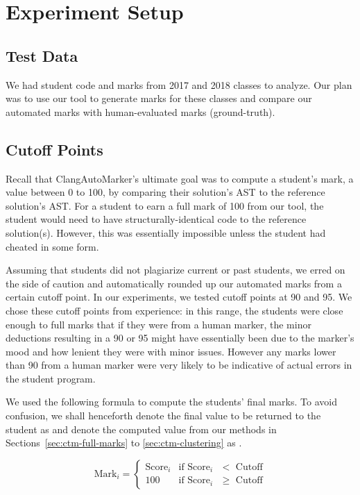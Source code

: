 \section{Experiment Setup}

\subsection{Test Data}

We had student code and marks from 2017 and 2018 classes to analyze. Our plan was to use our tool to generate marks for these classes and compare our automated marks with human-evaluated marks (ground-truth).

\subsection{Cutoff Points}
\label{sec:ctm-cutoffs}

Recall that ClangAutoMarker's ultimate goal was to compute a student's mark, a value between 0 to 100, by comparing their solution's AST to the reference solution's AST. For a student to earn a full mark of 100 from our tool, the student would need to have structurally-identical code to the reference solution(s). However, this was essentially impossible unless the student had cheated in some form.

Assuming that students did not plagiarize current or past students, we erred on the side of caution and automatically rounded up our automated marks from a certain cutoff point. In our experiments, we tested cutoff points at 90 and 95. We chose these cutoff points from experience: in this range, the students were close enough to full marks that if they were from a human marker, the minor deductions resulting in a 90 or 95 might have essentially been due to the marker's mood and how lenient they were with minor issues. However any marks lower than 90 from a human marker were very likely to be indicative of actual errors in the student program.

We used the following formula to compute the students' final marks. To avoid confusion, we shall henceforth denote the final value to be returned to the student as  and denote the computed value from our methods in Sections~\ref{sec:ctm-full-marks} to \ref{sec:ctm-clustering} as . 

\[
  \text{Mark}_i =
  \begin{cases}
    \text{Score}_i & \text{if Score$_i$ $<$ Cutoff} \\
    100            & \text{if Score$_i$ $\geq$ Cutoff}
  \end{cases}
\]

